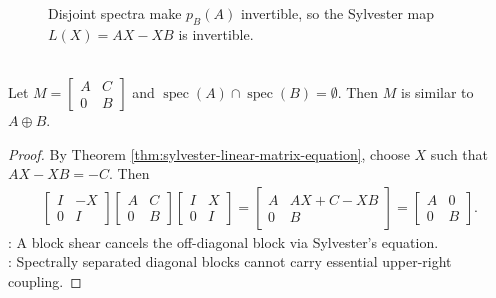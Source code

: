 \begin{figure}[H]
  \centering
  
  \caption{Disjoint spectra make $p_B(A)$ invertible, so the Sylvester map $L(X)=AX-XB$ is invertible.}
  \label{fig:sylvester-equation-spectral-gap}
\end{figure}

\begin{corollary} \label{cor:block-upper-triangular-remove-disjoint-coupling} \\
Let $M=\begin{bmatrix}A&C\\0&B\end{bmatrix}$ and $\operatorname{spec}(A)\cap\operatorname{spec}(B)=\emptyset$. Then $M$ is similar to $A\oplus B$.
\begin{proof}
By Theorem \ref{thm:sylvester-linear-matrix-equation}, choose $X$ such that $AX-XB=-C$. Then
\begin{align}
\begin{bmatrix}I&-X\\0&I\end{bmatrix}
\begin{bmatrix}A&C\\0&B\end{bmatrix}
\begin{bmatrix}I&X\\0&I\end{bmatrix}
=
\begin{bmatrix}A&AX+C-XB\\0&B\end{bmatrix}
=
\begin{bmatrix}A&0\\0&B\end{bmatrix}.
\nonumber
\end{align}
: A block shear cancels the off-diagonal block via Sylvester's equation.\\
: Spectrally separated diagonal blocks cannot carry essential upper-right coupling.
\end{proof}
\end{corollary}

